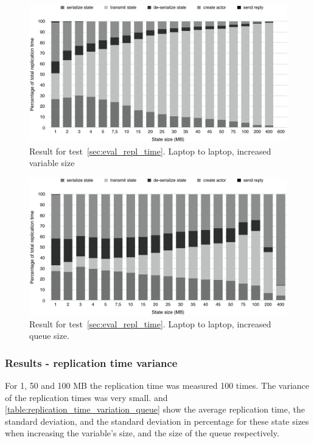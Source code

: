 \documentclass{cslthse-msc}
\begin{document}
\begin{figure}[hbt!]
\centering
\includegraphics[scale=0.5]{images/results/replication_time/laptop_parts_variable.pdf} 
\caption{Result for test~\ref{sec:eval_repl_time}. Laptop to laptop, increased variable size} \label{fig:replication_time_parts_laptop_variable}
\end{figure}

\begin{figure}[hbt!]
\centering
\includegraphics[scale=0.5]{images/results/replication_time/laptop_parts_queue.pdf} 
\caption{Result for test~\ref{sec:eval_repl_time}. Laptop to laptop, increased queue size.} \label{fig:replication_time_parts_laptop_queue}
\end{figure}

\subsubsection*{Results - replication time variance}
For 1, 50 and 100 MB the replication time was measured 100 times. The variance of the replication times was very small.  and \cref{table:replication_time_variation_queue} show the average replication time, the standard deviation, and the standard deviation in percentage for these state sizes when increasing the variable's size, and the size of the queue respectively.
 
\end{document}
